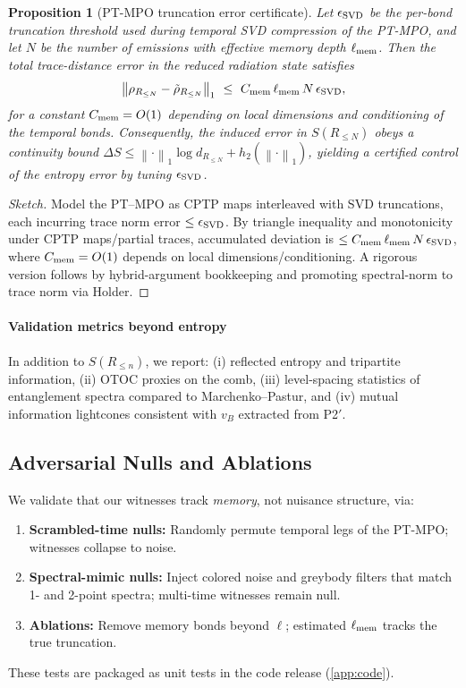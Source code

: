 \documentclass[a4paper,11pt]{article}
\newcommand{\ellmem}{\ensuremath{\ell_{\mathrm{mem}}}}
\theoremstyle{plain}
\newtheorem{proposition}{Proposition}
\theoremstyle{definition}
\theoremstyle{remark}
\begin{document}
\begin{proposition}[PT-MPO truncation error certificate]\label{prop:error}
Let $\epsilon_{\rm SVD}$ be the per-bond truncation threshold used during temporal SVD compression of the PT-MPO, and let $N$ be the number of emissions with effective memory depth $\ell_{\rm mem}$. Then the total trace-distance error in the reduced radiation state satisfies
\[
\left\|\rho_{R_{\le N}} - \tilde{\rho}_{R_{\le N}}\right\|_1 \ \le\ C_{\rm mem}\, \ell_{\rm mem}\, N\, \epsilon_{\rm SVD},
\]
for a constant $C_{\rm mem}=O(1)$ depending on local dimensions and conditioning of the temporal bonds. Consequently, the induced error in $S(R_{\le N})$ obeys a continuity bound $\Delta S \le \left\|\cdot\right\|_1 \log d_{R_{\le N}}+h_2(\left\|\cdot\right\|_1)$, yielding a certified control of the entropy error by tuning $\epsilon_{\rm SVD}$.
\end{proposition}
\begin{proof}[Sketch]
Model the PT--MPO as CPTP maps interleaved with SVD truncations, each incurring trace norm error $\le \epsilon_{\rm SVD}$. By triangle inequality and monotonicity under CPTP maps/partial traces, accumulated deviation is $\le C_{\rm mem}\,\ellmem\,N\,\epsilon_{\rm SVD}$, where $C_{\rm mem}=O(1)$ depends on local dimensions/conditioning. A rigorous version follows by hybrid-argument bookkeeping and promoting spectral-norm to trace norm via Holder.
\end{proof}

\paragraph{Validation metrics beyond entropy}
In addition to $S(R_{\le n})$, we report: (i) reflected entropy and tripartite information, (ii) OTOC proxies on the comb, (iii) level-spacing statistics of entanglement spectra compared to Marchenko--Pastur, and (iv) mutual information lightcones consistent with $v_B$ extracted from P2$'$.

\subsection{Adversarial Nulls and Ablations}
\label{subsec:adversarial}
We validate that our witnesses track \emph{memory}, not nuisance structure, via:
\begin{enumerate}[leftmargin=*,label=(\roman*)]
\item \textbf{Scrambled-time nulls:} Randomly permute temporal legs of the PT-MPO; witnesses collapse to noise.
\item \textbf{Spectral-mimic nulls:} Inject colored noise and greybody filters that match 1- and 2-point spectra; multi-time witnesses remain null.
\item \textbf{Ablations:} Remove memory bonds beyond $\ell$; estimated $\ell_{\rm mem}$ tracks the true truncation.
\end{enumerate}
These tests are packaged as unit tests in the code release (\cref{app:code}).
\end{document}
